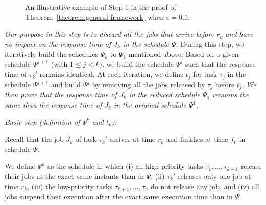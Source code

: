   


\begin{figure*}[t]
  \centering
\caption{An illustrative example of Step 1 in the proof of Theorem~\ref{theorem:general-framework} when $\epsilon = 0.1$.}
\label{fig:example}  
\end{figure*}



\emph{Our purpose in this step is to discard all the jobs that arrive before $r_k$ and have no impact on the response time of $J_k$ in the schedule
  $\Psi$. } During this step, we iteratively build the schedules $\Psi_k$ to $\Psi_1$ mentioned above. Based on a given schedule $\Psi^{j+1}$ (with $1 \leq j < k$), we build the schedule $\Psi^j$ such that the response time of $\tau_{k}'$ remains identical. At each iteration, we define $t_j$ for task $\tau_j$ in the schedule $\Psi^{j+1}$ and build $\Psi^j$ by removing all the jobs released by $\tau_j$ before $t_j$. \emph{We then prove that the response time of $J_k$ in the reduced schedule $\Psi_1$ remains the same than the response time of $J_k$ in  the original schedule $\Psi^1$.}


\noindent\textit{Basic step (definition of $\Psi^k$ and $t_k$):} 

Recall that the job $J_{k}$ of task $\tau_k'$ arrives at time $r_k$ and finishes at time $f_k$ in schedule $\Psi$.

We define $\Psi^k$ as the schedule in which (i) all high-priority tasks $\tau_1, \ldots, \tau_{k-1}$ release their jobs at the exact same instants than in $\Psi$, (ii) $\tau_k'$ releases only one job at time $r_k$, (iii) the low-priority tasks $\tau_{k+1}, \ldots, \tau_n$ do not release any job, and (iv) all jobs suspend their execution after the exact same execution time than in $\Psi$. 

